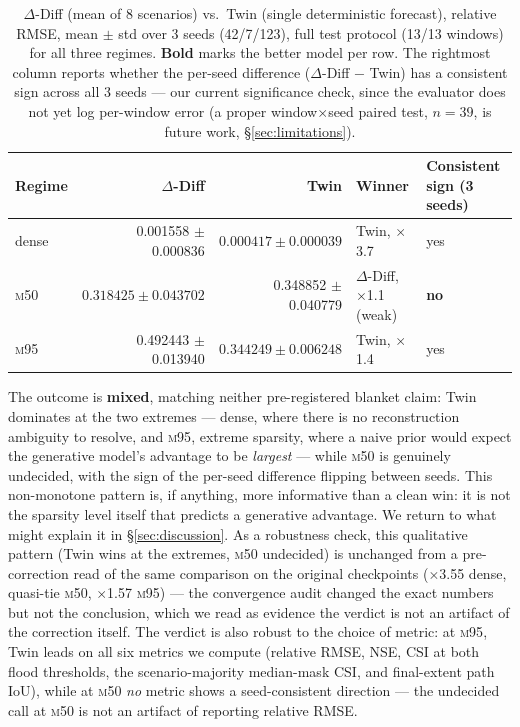 \documentclass[11pt]{article}
\newcommand{\ours}{\mbox{$\Delta$-Diff}}       %
\newcommand{\twin}{\mbox{Twin}}                 %
\newcommand{\mfifty}{\textsc{m50}}
\newcommand{\mninetyfive}{\textsc{m95}}
\begin{document}
\begin{table}[H]
\centering
\caption{\ours{} (mean of 8 scenarios) vs.\ \twin{} (single deterministic
forecast), relative RMSE, mean $\pm$ std over 3 seeds (42/7/123), full
test protocol (13/13 windows) for all three regimes. \textbf{Bold} marks
the better model per row. The rightmost
column reports whether the per-seed difference (\ours{} $-$ \twin{}) has
a consistent sign across all 3 seeds --- our current significance check,
since the evaluator does not yet log per-window error (a proper
window$\times$seed paired test, $n{=}39$, is future work,
\S\ref{sec:limitations}).}
\label{tab:twinresults}
\begin{tabular}{lrrll}
\toprule
Regime & \ours{} & \twin{} & Winner & Consistent sign (3 seeds) \\
\midrule
dense & 0.001558 $\pm$ 0.000836 & $\mathbf{0.000417 \pm 0.000039}$ & \twin{}, $\times$3.7 & yes \\
\mfifty{} & $\mathbf{0.318425 \pm 0.043702}$ & 0.348852 $\pm$ 0.040779 & \ours{}, $\times$1.1 (weak) & \textbf{no} \\
\mninetyfive{} & 0.492443 $\pm$ 0.013940 & $\mathbf{0.344249 \pm 0.006248}$ & \twin{}, $\times$1.4 & yes \\
\bottomrule
\end{tabular}
\end{table}

The outcome is \textbf{mixed}, matching neither pre-registered blanket
claim: \twin{} dominates at the two extremes --- dense, where there is no
reconstruction ambiguity to resolve, and \mninetyfive{}, extreme sparsity,
where a naive prior would expect the generative model's advantage to be
\emph{largest} --- while \mfifty{} is genuinely undecided, with the sign
of the per-seed difference flipping between seeds. This non-monotone
pattern is, if anything, more informative than a clean win: it is not the
sparsity level itself that predicts a generative advantage. We return to
what might explain it in \S\ref{sec:discussion}. As a robustness check,
this qualitative pattern (\twin{} wins at the extremes, \mfifty{}
undecided) is unchanged from a pre-correction read of the same comparison
on the original checkpoints ($\times$3.55 dense, quasi-tie \mfifty{},
$\times$1.57 \mninetyfive{}) --- the convergence audit changed the exact
numbers but not the conclusion, which we read as evidence the verdict is
not an artifact of the correction itself. The verdict is also robust to
the choice of metric: at \mninetyfive{}, \twin{} leads on all six metrics
we compute (relative RMSE, NSE, CSI at both flood thresholds, the
scenario-majority median-mask CSI, and final-extent path IoU), while at
\mfifty{} \emph{no} metric shows a seed-consistent direction --- the
undecided call at \mfifty{} is not an artifact of reporting relative RMSE.
\FloatBarrier
\end{document}
